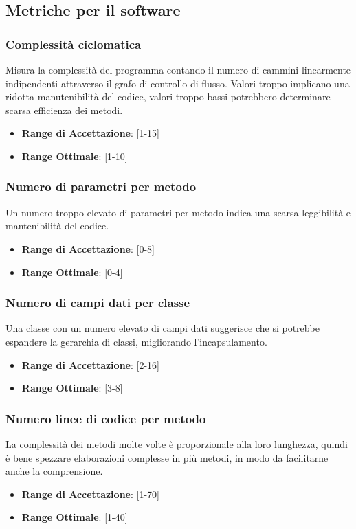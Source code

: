 \documentclass[12pt,a4paper]{article}
\begin{document}
\subsection{ Metriche per il software}\label{metriche_sw}
\subsubsection{Complessità ciclomatica}
Misura la complessità del programma contando il numero di cammini linearmente indipendenti attraverso il grafo di controllo di flusso. Valori troppo implicano una ridotta manutenibilità del codice, valori troppo bassi potrebbero determinare scarsa efficienza dei metodi.
\begin{itemize}
\item \textbf{Range di Accettazione}: [1-15]
\item \textbf{Range Ottimale}: [1-10]
\end{itemize}
\subsubsection{Numero di parametri per metodo}
Un numero troppo elevato di parametri per metodo indica una scarsa leggibilità e mantenibilità del codice.
\begin{itemize}
\item \textbf{Range di Accettazione}: [0-8]
\item \textbf{Range Ottimale}: [0-4]
\end{itemize}
\subsubsection{Numero di campi dati per classe}
Una classe con un numero elevato di campi dati suggerisce che si potrebbe espandere la gerarchia di classi, migliorando l'incapsulamento.
\begin{itemize}
\item \textbf{Range di Accettazione}: [2-16]
\item \textbf{Range Ottimale}: [3-8]
\end{itemize}
\subsubsection{Numero linee di codice per metodo}
La complessità dei metodi molte volte è proporzionale alla loro lunghezza,
quindi è bene spezzare elaborazioni complesse in più metodi, in modo da facilitarne anche la comprensione.
\begin{itemize}
\item \textbf{Range di Accettazione}: [1-70]
\item \textbf{Range Ottimale}: [1-40]
\end{itemize}
\end{document}
